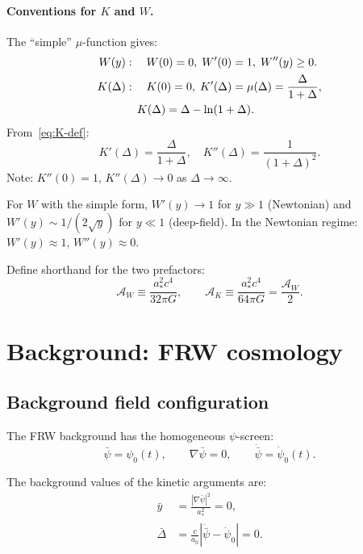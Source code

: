 \documentclass[aps,prd,twocolumn,nofootinbib]{revtex4-2}
\newcommand{\aM}{a_0}
\newcommand{\astar}{a_*}
\begin{document}
\paragraph{Conventions for $K$ and $W$.}
The ``simple'' $\mu$-function gives:
\begin{align}
W(y) &: \quad W(0) = 0,\; W'(0) = 1,\; W''(y) \geq 0. \label{eq:W-props}\\
K(\Delta) &: \quad K(0) = 0,\; K'(\Delta) = \mu(\Delta) = \frac{\Delta}{1+\Delta},
\notag\\
&\quad K(\Delta) = \Delta - \ln(1+\Delta). \label{eq:K-def}
\end{align}
From~\eqref{eq:K-def}:
\begin{equation}
K'(\Delta) = \frac{\Delta}{1+\Delta},\quad
K''(\Delta) = \frac{1}{(1+\Delta)^2}.
\label{eq:K-derivs}
\end{equation}
Note: $K''(0) = 1$, $K''(\Delta) \to 0$ as $\Delta \to \infty$.

For $W$ with the simple form, $W'(y) \to 1$ for $y \gg 1$ (Newtonian)
and $W'(y) \sim 1/(2\sqrt{y})$ for $y \ll 1$ (deep-field).
In the Newtonian regime: $W'(y) \approx 1$, $W''(y) \approx 0$.

Define shorthand for the two prefactors:
\begin{equation}
\mathcal{A}_W \equiv \frac{\astar^2 c^4}{32\pi G}, \qquad
\mathcal{A}_K \equiv \frac{\astar^2 c^4}{64\pi G} = \frac{\mathcal{A}_W}{2}.
\label{eq:prefactors}
\end{equation}

\section{Background: FRW cosmology}
\label{sec:background}

\subsection{Background field configuration}

The FRW background has the homogeneous $\psi$-screen:
\begin{equation}
\bar\psi = \psi_0(t), \qquad \nabla\bar\psi = 0, \qquad
\dot{\bar\psi} = \dot\psi_0(t).
\label{eq:bg-psi}
\end{equation}

The background values of the kinetic arguments are:
\begin{align}
\bar{y} &= \frac{|\nabla\bar\psi|^2}{\astar^2} = 0, \label{eq:y-bg}\\
\bar\Delta &= \frac{c}{\aM}|\dot{\bar\psi} - \dot\psi_0| = 0.
\label{eq:Delta-bg}
\end{align}
\end{document}
